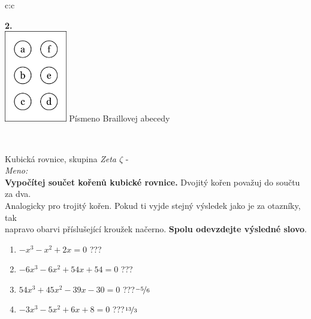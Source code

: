 \documentclass[10pt]{report}
\begin{document}
\begin{tabular}{c:c}
\begin{minipage}[c][99mm][t]{0.49\linewidth}
\begin{center}
\begin{minipage}{0.77\linewidth}
\begin{center}
\begin{varwidth}{\textwidth}
\end{varwidth}
\end{center}
\end{minipage}
\begin{minipage}{0.20\linewidth}
\begin{center}
{\Huge\bfseries 2.} \\[2mm]
\includegraphics[height=40mm]{../images/braille.png}
{\small Písmeno Braillovej abecedy}
\end{center}
\end{minipage}
\end{center}
\end{minipage}
\\ \hdashline
\begin{minipage}[c][99mm][t]{0.49\linewidth}
\begin{center}
\vspace{7mm}
{\huge Kubická rovnice, skupina \textit{Zeta $\zeta$} -}\\[4.5mm]
\textit{Meno:}\phantom{xxxxxxxxxxxxxxxxxxxxxxxxxxxxxxxxxxxxxxxxxxxxxxxxxxxxxxxxxxxxxxxxx}\\[3.5mm]
\textbf{Vypočítej součet kořenů kubické rovnice.} Dvojitý kořen považuj do součtu za dva.\\Analogicky pro trojitý kořen. Pokud ti vyjde stejný výsledek jako je za otazníky, tak\\napravo obarvi příslušející kroužek načerno. \textbf{Spolu odevzdejte výsledné slovo}.\\[3mm]
\begin{minipage}{0.77\linewidth}
\begin{center}
\begin{varwidth}{\textwidth}
\begin{enumerate}
\large
\item $-x^3-x^2+2x=0$\quad \dotfill\; ???\;\dotfill {}
\item $-6x^3-6x^2+54x+54=0$\quad \dotfill\; ???\;\dotfill {}
\item $54x^3+45x^2-39x-30=0$\quad \dotfill\; ???\;\dotfill \quad $\nicefrac{-5}{6}$
\item $-3x^3-5x^2+6x+8=0$\quad \dotfill\; ???\;\dotfill \quad $\nicefrac{13}{3}$

\end{enumerate}
\end{varwidth}
\end{center}
\end{minipage}
\end{center}
\end{minipage}
\end{tabular}
\end{document}
